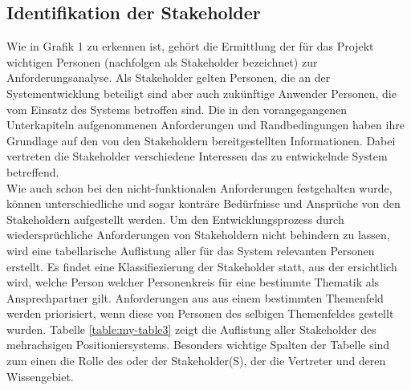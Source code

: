 \documentclass[../Bachelorarbeit.tex]{subfiles}
\begin{document}
\clearpage
\subsection{Identifikation der Stakeholder}
Wie in Grafik 1 zu erkennen ist, gehört die Ermittlung der für das Projekt wichtigen Personen (nachfolgen als Stakeholder bezeichnet) zur Anforderungsanalyse. Als Stakeholder gelten Personen, die an der Systementwicklung beteiligt sind aber auch zukünftige Anwender \bzw Personen, die vom Einsatz des Systems betroffen sind. Die in den vorangegangenen Unterkapiteln aufgenommenen Anforderungen und Randbedingungen haben ihre Grundlage auf den von den Stakeholdern bereitgestellten Informationen. Dabei vertreten die Stakeholder verschiedene Interessen das zu entwickelnde System betreffend.\\ %
Wie auch schon bei den nicht-funktionalen Anforderungen festgehalten wurde, können unterschiedliche und sogar konträre Bedürfnisse und Ansprüche von den Stakeholdern aufgestellt werden. Um den Entwicklungsprozess durch wiedersprüchliche Anforderungen von Stakeholdern nicht behindern zu lassen, wird eine tabellarische Auflistung aller für das System relevanten Personen erstellt. Es findet eine Klassifiezierung der Stakeholder statt, aus der ersichtlich wird, welche Person \bzw welcher Personenkreis für eine bestimmte Thematik als Ansprechpartner gilt. Anforderungen aus aus einem bestimmten Themenfeld werden priorisiert, wenn diese von Personen des selbigen Themenfeldes gestellt wurden. Tabelle \ref{table:my-table3} zeigt die Auflistung aller Stakeholder des mehrachsigen Positioniersystems. Besonders wichtige Spalten der Tabelle sind zum einen die Rolle des oder der Stakeholder(S), der \bzw die Vertreter und deren Wissengebiet.\\
\end{document}
